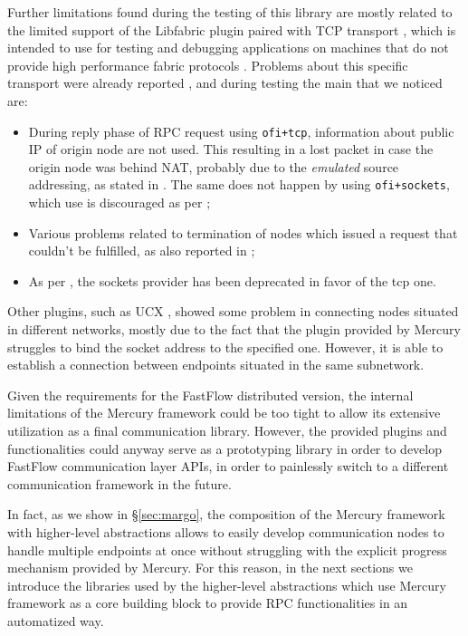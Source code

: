 Further limitations found during the testing of this library are mostly related to the limited support of the Libfabric plugin paired with TCP transport \cite{mercury_plugins}, which is intended to use for testing and debugging applications on machines that do not provide high performance fabric protocols \cite{ofi_tcp}. Problems about this specific transport were already reported \cite{ofi_tcp, git_mercury_tcp, git_mercury_tcp332}, and during testing the main that we noticed are:
\begin{itemize}
    \item During reply phase of RPC request using \texttt{ofi+tcp}, information about public IP of origin node are not used. This resulting in a lost packet in case the origin node was behind NAT, probably due to the \textit{emulated} source addressing, as stated in \cite{ofi_plugin}. The same does not happen by using \texttt{ofi+sockets}, which use is discouraged as per \cite{mercury_plugins};
    \item Various problems related to termination of nodes which issued a request that couldn't be fulfilled, as also reported in \cite{git_mercury_tcp};
    \item As per \cite{libfabric-github}, the sockets provider has been deprecated in favor of the tcp one. 
\end{itemize}

Other plugins, such as UCX \cite{ucx_plugin}, showed some problem in connecting nodes situated in different networks, mostly due to the fact that the plugin provided by Mercury struggles to bind the socket address to the specified one. However, it is able to establish a connection between endpoints situated in the same subnetwork.\newline

Given the requirements for the FastFlow distributed version, the internal limitations of the Mercury framework could be too tight to allow its extensive utilization as a final communication library. However, the provided plugins and functionalities could anyway serve as a prototyping library in order to develop FastFlow communication layer APIs, in order to painlessly switch to a different communication framework in the future.\newline

In fact, as we show in \S\ref{sec:margo}, the composition of the Mercury framework with higher-level abstractions allows to easily develop communication nodes to handle multiple endpoints at once without struggling with the explicit progress mechanism provided by Mercury. For this reason, in the next sections we introduce the libraries used by the higher-level abstractions which use Mercury framework as a core building block to provide RPC functionalities in an automatized way.
